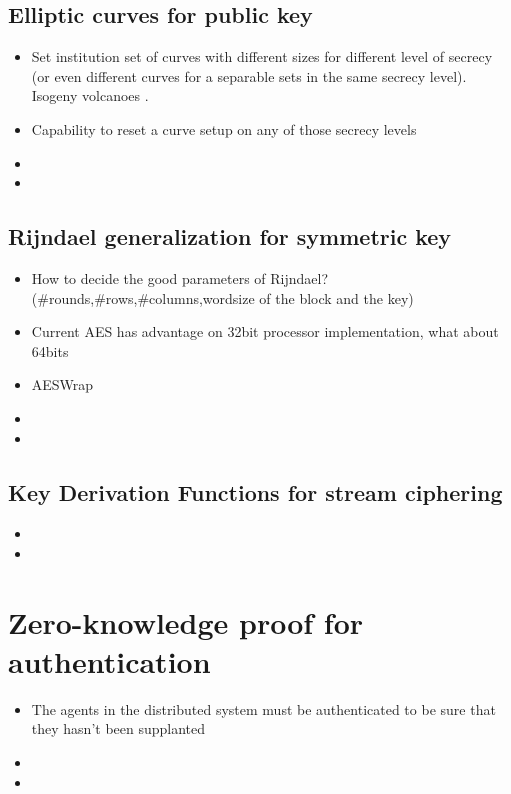 \documentclass[10pt,a4paper,twoside]{llncs}
\begin{document}
%
\subsection{Elliptic curves for public key}

\begin{itemize}
 \item Set institution set of curves with different sizes for different level of secrecy (or even different curves for a separable sets in the same secrecy level). Isogeny volcanoes \cite{secRickShareECs}.
 \item Capability to reset a curve setup on any of those secrecy levels 
 \item 
 \item 
\end{itemize}

%
\subsection{Rijndael generalization for symmetric key}

\begin{itemize}
 \item How to decide the good parameters of Rijndael? (\#rounds,\#rows,\#columns,wordsize of the block and the key) \cite{gRijndael}
 \item Current AES has advantage on 32bit processor implementation, what about 64bits
 \item AESWrap \cite{rfc3394}
 \item 
 \item 
\end{itemize}

%
\subsection{Key Derivation Functions for stream ciphering}

\begin{itemize}
 \item 
 \item 
\end{itemize}

%
\section{Zero-knowledge proof for authentication \label{sec:auth}}
\begin{itemize}
 \item The agents in the distributed system must be authenticated to be sure that they hasn't been supplanted
 \item 
 \item 
\end{itemize}
\end{document}
